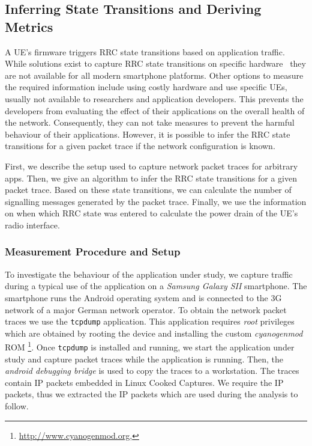 \subsection{Inferring State Transitions and Deriving Metrics}\label{sec:network:network_traces:performance_evaluation}
A \gls{UE}’s firmware triggers \gls{RRC} state transitions based on application traffic.
While solutions exist to capture RRC state transitions on specific hardware~\cite{zayas2010} they are not available for all modern smartphone platforms.
Other options to measure the required information include using costly hardware and use specific \glspl{UE}, usually not available to researchers and application developers.
This prevents the developers from evaluating the effect of their applications on the overall health
of the network.
Consequently, they can not take measures to prevent the harmful behaviour of their applications.
However, it is possible to infer the \gls{RRC} state transitions for a given packet trace if the network configuration is known.

First, we describe the setup used to capture network packet traces for arbitrary apps.
Then, we give an algorithm to infer the \gls{RRC} state transitions for a given packet trace.
Based on these state transitions, we can calculate the number of signalling messages generated
by the packet trace. 
Finally, we use the information on when which \gls{RRC} state was entered to calculate the power drain of the \gls{UE}’s radio interface.

\subsubsection*{Measurement Procedure and Setup}\label{sec:network:network_traces:performance_evaluation:measurement}
To investigate the behaviour of the application under study, we capture traffic during a typical use of the application on a \emph{Samsung Galaxy SII} smartphone.
The smartphone runs the Android operating system and is connected to the \gls{3G} network of a major German network operator.
To obtain the network packet traces we use the \texttt{tcpdump} application.
This application requires \emph{root} privileges which are obtained by rooting the device and installing the custom \emph{cyanogenmod} ROM \footnote{\url{http://www.cyanogenmod.org}, \accessed}.
Once \texttt{tcpdump} is installed and running, we start the application under study and capture packet traces while the application is running.
Then, the \emph{android debugging bridge} is used to copy the traces to a workstation.
The traces contain \gls{IP} packets embedded in Linux Cooked Captures.
We require the \gls{IP} packets, thus we extracted the \gls{IP} packets which are used during the analysis to follow.

